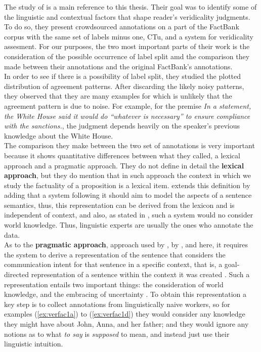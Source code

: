 The study of \citet{de2012did} is a main reference to this thesis. Their goal was to identify some of the linguistic and contextual factors that shape reader's veridicality judgments. To do so, they present crowdsourced annotations on a part of the FactBank corpus with the same set of labels minus one, CTu, and a system for veridicality assesment. For our purposes, the two most important parts of their work is the consideration of the possible occurrence of label split amd the comparison they made between their annotations and the original FactBank's annotations.\\

In order to see if there is a possibility of label split, they studied the plotted distribution of agreement patterns. After discarding the likely noisy patterns, they observed that they are many examples for which is unlikely that the agreement pattern is due to noise. For example, for the premise \textit{In a statement, the White House said it would do “whatever is necessary” to ensure compliance with the sanctions.}, the judgment depends heavily on the speaker's previous knowledge about the White House.\\ 

The comparison they make between the two set of annotations is very important because it shows quantitative differences between what they called, a lexical approach and a pragmatic approach. They do not define in detail the \textbf{lexical approach}, but they do mention that in such approach the context in which we study the factuality of a proposition is a lexical item. \citet{ross2019well} extends this definition by adding that a system following it should aim to model the aspects of a sentence semantics, thus, this representation can be derived from the lexicon and is independent of context, and also, as stated in \citet{sauri2009factbank}, such a system would no consider world knowledge. Thus, linguistic experts are usually the ones who annotate the data.\\ 

As to the \textbf{pragmatic approach}, approach used by \citet{de2012did}, by \citet{ross2019well}, and here, it requires the system to derive a representation of the sentence that considers the communication intent for that sentence in a specific context, that is, a goal-directed  representation of a sentence within the context it was created \citep{ross2019well}. Such a representation entails two important things: the consideration of world knowledge, and the embracing of uncertainty \citep{de2012did}. To obtain this representation a key step is to collect annotations from linguistically naive workers, so for examples (\ref{ex:verfac1a}) to (\ref{ex:verfac1d}) they would consider any knowledge they might have about John, Anna, and her father; and they would ignore any notions as to what \textit{to say} is \textit{supposed} to mean, and instead just use their linguistic intuition.\\

